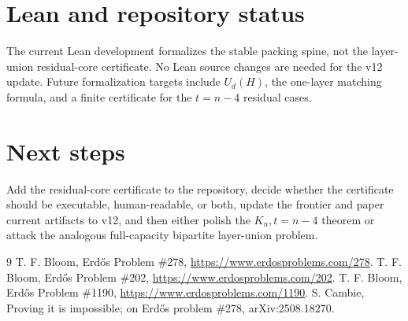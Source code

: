 \documentclass[11pt]{article}
\begin{document}
\section{Lean and repository status}
The current Lean development formalizes the stable packing spine, not the layer-union residual-core certificate. No Lean source changes are needed for the v12 update. Future formalization targets include $U_d(H)$, the one-layer matching formula, and a finite certificate for the $t=n-4$ residual cases.

\section{Next steps}
Add the residual-core certificate to the repository, decide whether the certificate should be executable, human-readable, or both, update the frontier and paper current artifacts to v12, and then either polish the $K_n,t=n-4$ theorem or attack the analogous full-capacity bipartite layer-union problem.

\begin{thebibliography}{9}
 T. F. Bloom, Erd\H{o}s Problem \#278, \url{https://www.erdosproblems.com/278}.
 T. F. Bloom, Erd\H{o}s Problem \#202, \url{https://www.erdosproblems.com/202}.
 T. F. Bloom, Erd\H{o}s Problem \#1190, \url{https://www.erdosproblems.com/1190}.
 S. Cambie, Proving it is impossible; on Erd\H{o}s problem \#278, arXiv:2508.18270.
\end{thebibliography}
\end{document}
